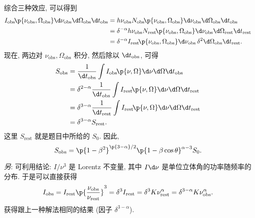 \documentclass{article}
\newcommand{\mrm}[1]{\mathrm{#1}}
\newcommand{\tit}[1]{\textit{#1}}
\newcommand{\alp}{\alpha}
\newcommand{\dlt}{\delta}
\newcommand{\tht}{\theta}
\newcommand{\Omg}{\Omega}
\newcommand{\fr}{\frac}
\newcommand{\fc}[2]{#1\mathchoice{\!}{\!}{}{}\p{#2}} %
\begin{document}
综合三种效应, 可以得到
\begin{align*}
	\fc{I_\mrm{obs}}{\nu_\mrm{obs},\Omg_\mrm{obs}}\d\nu_\mrm{obs}\d\Omg_\mrm{obs}\d t_\mrm{obs}
	&=h\nu_\mrm{obs}\fc{N_\mrm{obs}}{\nu_\mrm{obs},\Omg_\mrm{obs}}\d\nu_\mrm{obs}\d\Omg_\mrm{obs}\d t_\mrm{obs}\\
	&=\dlt^{-\alp}h\nu_\mrm{obs}\fc{N_\mrm{rest}}{\nu_\mrm{obs},\Omg_\mrm{obs}}\d\nu_\mrm{obs}\d\Omg_\mrm{rest}\d t_\mrm{rest}\\
	&=\dlt^{-\alp}\fc{I_\mrm{rest}}{\nu_\mrm{obs},\Omg_\mrm{obs}}\d\nu_\mrm{obs}\,\dlt^2\d\Omg_\mrm{obs}\d t_\mrm{rest}.
\end{align*}
现在, 两边对 $\nu_\mrm{obs},\Omg_\mrm{obs}$ 积分, 然后除以 $\d t_\mrm{obs}$, 可得
\begin{align*}
	S_\mrm{obs}&=\fr1{\d t_\mrm{obs}}\int\fc{I_\mrm{obs}}{\nu,\Omg}\d\nu\d\Omg\d t_\mrm{obs}\\
	&=\dlt^{2-\alp}\fr1{\d t_\mrm{obs}}\int\fc{I_\mrm{rest}}{\nu,\Omg}\d\nu\d\Omg\d t_\mrm{rest}\\
	&=\dlt^{3-\alp}\fr1{\d t_\mrm{rest}}\int\fc{I_\mrm{rest}}{\nu,\Omg}\d\nu\d\Omg\d t_\mrm{rest}\\
	&=\dlt^{3-\alp}S_\mrm{rest}.
\end{align*}
这里 $S_\mrm{rest}$ 就是题目中所给的 $S_0$. 因此,
\[S_\mrm{obs}=\p{1-\beta^2}^{\p{3-\alp}/2}\p{1-\beta\cos\tht}^{\alp-3}S_0.\]

\tit{另}: 可利用结论: $I/\nu^3$ 是 Lorentz 不变量, 其中 $I\d\nu$ 是单位立体角的功率随频率的分布.
于是可以直接获得
\[I_\mrm{obs}=I_\mrm{rest}\p{\fr{\nu_\mrm{obs}}{\nu_\mrm{rest}}}^3
=\dlt^3I_\mrm{rest}=\dlt^3K\nu_\mrm{rest}^\alp=\dlt^{3-\alp}K\nu_\mrm{obs}^\alp.\]
获得跟上一种解法相同的结果 (因子 $\dlt^{3-\alp}$).
\end{document}
